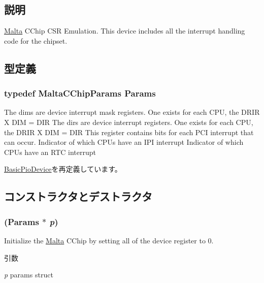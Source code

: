 \subsection{説明}
\hyperlink{classMalta}{Malta} CChip CSR Emulation. This device includes all the interrupt handling code for the chipset. 

\subsection{型定義}
\hypertarget{classMaltaCChip_a7a47c530613bf1fa98cc01dad4ffc4e3}{
\subsubsection[{Params}]{\setlength{\rightskip}{0pt plus 5cm}typedef MaltaCChipParams {\bf Params}}}
\label{classMaltaCChip_a7a47c530613bf1fa98cc01dad4ffc4e3}
The dims are device interrupt mask registers. One exists for each CPU, the DRIR X DIM = DIR The dirs are device interrupt registers. One exists for each CPU, the DRIR X DIM = DIR This register contains bits for each PCI interrupt that can occur. Indicator of which CPUs have an IPI interrupt Indicator of which CPUs have an RTC interrupt 

\hyperlink{classBasicPioDevice_a2845515ac6467f10540747053c8a0449}{BasicPioDevice}を再定義しています。

\subsection{コンストラクタとデストラクタ}
\hypertarget{classMaltaCChip_aa4ac6a02ebf51ef5435118450b4908f3}{
\subsubsection[{MaltaCChip}]{ ({\bf Params} $\ast$ {\em p})}}
\label{classMaltaCChip_aa4ac6a02ebf51ef5435118450b4908f3}
Initialize the \hyperlink{classMalta}{Malta} CChip by setting all of the device register to 0. 
\begin{DoxyParams}{引数}
\item[{\em p}]params struct \end{DoxyParams}



